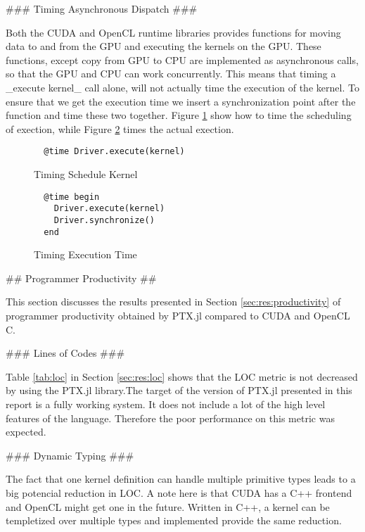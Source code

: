 \begin{markdown}
### Timing Asynchronous Dispatch ###

Both the \gls{CUDA} and \gls{OpenCL} runtime libraries provides
functions for moving data to and from the GPU and executing the
kernels on the \gls{GPU}. These functions, except copy from GPU to CPU
are implemented as asynchronous calls, so that the GPU and CPU can
work concurrently. This means that timing a _execute kernel_ call
alone, will not actually time the execution of the kernel. To ensure
that we get the execution time we insert a synchronization point after
the function and time these two together. Figure
\ref{fig:disc:async-call:sched} show how to time the scheduling of
exection, while Figure \ref{fig:disc:async-call:exec} times the actual
exection.

\begin{figure}[H]
  \begin{verbatim}
  @time Driver.execute(kernel)
  \end{verbatim}
  \caption{Timing Schedule Kernel}
  \label{fig:disc:async-call:sched}
\end{figure}

\begin{figure}[H]
  \begin{verbatim}
  @time begin
    Driver.execute(kernel)
    Driver.synchronize()
  end
  \end{verbatim}
  \caption{Timing Execution Time}
  \label{fig:disc:async-call:exec}
\end{figure}


## Programmer Productivity ##

This section discusses the results presented in Section
\ref{sec:res:productivity} of programmer productivity obtained by
PTX.jl compared to CUDA and OpenCL C.

### Lines of Codes ###

Table \ref{tab:loc} in Section \ref{sec:res:loc} shows that
the LOC metric is not decreased by using the PTX.jl library.The target
of the version of PTX.jl presented in this report is a fully working
system. It does not include a lot of the high level features of the
language. Therefore the poor performance on this metric was expected.

### Dynamic Typing ###

The fact that one kernel definition can handle multiple primitive
types leads to a big potencial reduction in LOC. A note here is that
CUDA has a C++ frontend and OpenCL might get one in the
future. Written in C++, a kernel can be templetized over multiple
types and implemented provide the same reduction.


\end{markdown}

